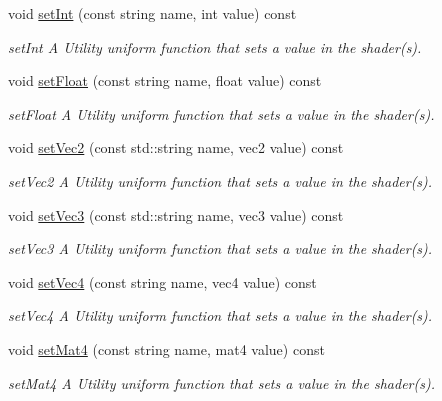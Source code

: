 \begin{DoxyCompactItemize}
\mbox{\label{classShader_a21207694374340b8ee875fc98f328c02}} 
void \hyperlink{classShader_a21207694374340b8ee875fc98f328c02}{set\+Int} (const string name, int value) const
\begin{DoxyCompactList}\small\item\em set\+Int A Utility uniform function that sets a value in the shader(s). \end{DoxyCompactList}\item 
\mbox{\label{classShader_ac9c9c3fb7cd36476259014d8d2cfb1b3}} 
void \hyperlink{classShader_ac9c9c3fb7cd36476259014d8d2cfb1b3}{set\+Float} (const string name, float value) const
\begin{DoxyCompactList}\small\item\em set\+Float A Utility uniform function that sets a value in the shader(s). \end{DoxyCompactList}\item 
\mbox{\label{classShader_ac6e5445f707c5683b93a80e4400c2ddf}} 
void \hyperlink{classShader_ac6e5445f707c5683b93a80e4400c2ddf}{set\+Vec2} (const std\+::string name, vec2 value) const
\begin{DoxyCompactList}\small\item\em set\+Vec2 A Utility uniform function that sets a value in the shader(s). \end{DoxyCompactList}\item 
\mbox{\label{classShader_a64ec79e7982e247bbc71597ea029f7cf}} 
void \hyperlink{classShader_a64ec79e7982e247bbc71597ea029f7cf}{set\+Vec3} (const std\+::string name, vec3 value) const
\begin{DoxyCompactList}\small\item\em set\+Vec3 A Utility uniform function that sets a value in the shader(s). \end{DoxyCompactList}\item 
\mbox{\label{classShader_abcee967cfebf28f0c6f856a21352059e}} 
void \hyperlink{classShader_abcee967cfebf28f0c6f856a21352059e}{set\+Vec4} (const string name, vec4 value) const
\begin{DoxyCompactList}\small\item\em set\+Vec4 A Utility uniform function that sets a value in the shader(s). \end{DoxyCompactList}\item 
\mbox{\label{classShader_a8ec1174e2bae33622c1ebe1e8efab911}} 
void \hyperlink{classShader_a8ec1174e2bae33622c1ebe1e8efab911}{set\+Mat4} (const string name, mat4 value) const
\begin{DoxyCompactList}\small\item\em set\+Mat4 A Utility uniform function that sets a value in the shader(s). \end{DoxyCompactList}\end{DoxyCompactItemize}

